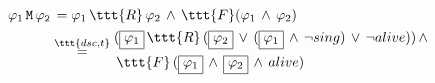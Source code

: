 \documentclass[11pt]{article}
\begin{document}
$\begin{aligned}
      \varphi_1\,\tt{M}\,\varphi_2 &\,= \varphi_1\,\ttt{R}\,\varphi_2\,\land\,\ttt{F}(\varphi_1\,\land\,\varphi_2) \\
      &\overset{\ttt{dsc,t}}{=} \begin{aligned}
                                       &(\boxed{\varphi_1}\,\ttt{R}\,(\boxed{\varphi_2}\,\lor\,(\boxed{\varphi_1}\,\land\,\neg sing)\,\lor\,\neg alive))\,\land\\
                                       &\,\ttt{F}\,(\boxed{\varphi_1}\,\land\,\boxed{\varphi_2}\,\land\,alive)
      \end{aligned}
\end{aligned}$
\end{document}
